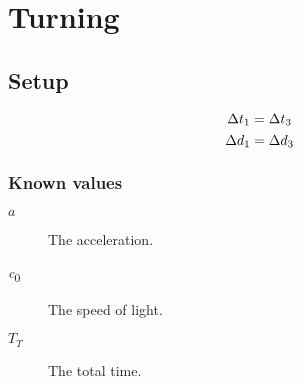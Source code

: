 \section{Turning}
	\subsection{Setup}
		
		\[\mathrm{\Delta} t_1 = \mathrm{\Delta} t_3\]
		\[\mathrm{\Delta} d_1 = \mathrm{\Delta} d_3\]
		\subsubsection{Known values}
			\begin{description}
				\item[$a$] The acceleration.
				\item[\si{\clight}] The speed of light.
				\item[$T_T$] The total time.
			\end{description}
